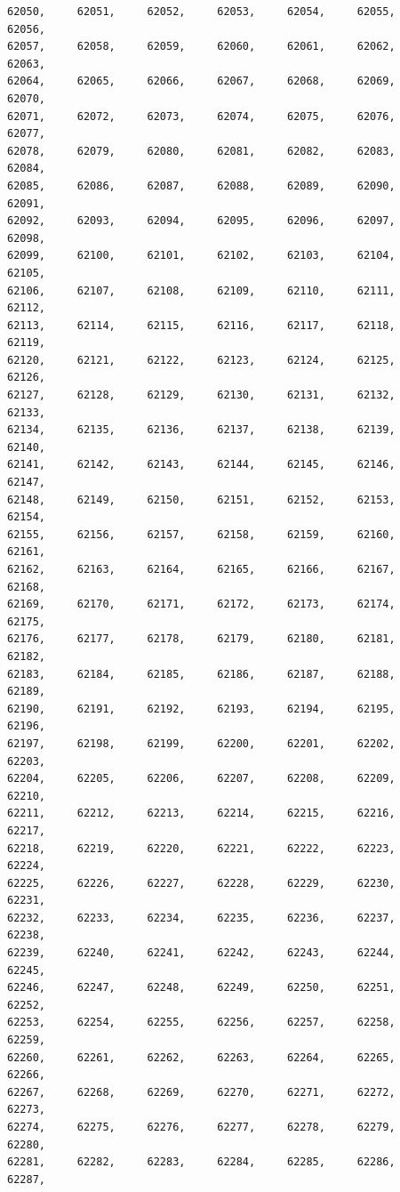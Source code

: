 \documentclass[a4paper,11pt]{report}
\begin{document}
\begin{verbatim}
62050,     62051,     62052,     62053,     62054,     62055,     62056,     
62057,     62058,     62059,     62060,     62061,     62062,     62063,     
62064,     62065,     62066,     62067,     62068,     62069,     62070,     
62071,     62072,     62073,     62074,     62075,     62076,     62077,     
62078,     62079,     62080,     62081,     62082,     62083,     62084,     
62085,     62086,     62087,     62088,     62089,     62090,     62091,     
62092,     62093,     62094,     62095,     62096,     62097,     62098,     
62099,     62100,     62101,     62102,     62103,     62104,     62105,     
62106,     62107,     62108,     62109,     62110,     62111,     62112,     
62113,     62114,     62115,     62116,     62117,     62118,     62119,     
62120,     62121,     62122,     62123,     62124,     62125,     62126,     
62127,     62128,     62129,     62130,     62131,     62132,     62133,     
62134,     62135,     62136,     62137,     62138,     62139,     62140,     
62141,     62142,     62143,     62144,     62145,     62146,     62147,     
62148,     62149,     62150,     62151,     62152,     62153,     62154,     
62155,     62156,     62157,     62158,     62159,     62160,     62161,     
62162,     62163,     62164,     62165,     62166,     62167,     62168,     
62169,     62170,     62171,     62172,     62173,     62174,     62175,     
62176,     62177,     62178,     62179,     62180,     62181,     62182,     
62183,     62184,     62185,     62186,     62187,     62188,     62189,     
62190,     62191,     62192,     62193,     62194,     62195,     62196,     
62197,     62198,     62199,     62200,     62201,     62202,     62203,     
62204,     62205,     62206,     62207,     62208,     62209,     62210,     
62211,     62212,     62213,     62214,     62215,     62216,     62217,     
62218,     62219,     62220,     62221,     62222,     62223,     62224,     
62225,     62226,     62227,     62228,     62229,     62230,     62231,     
62232,     62233,     62234,     62235,     62236,     62237,     62238,     
62239,     62240,     62241,     62242,     62243,     62244,     62245,     
62246,     62247,     62248,     62249,     62250,     62251,     62252,     
62253,     62254,     62255,     62256,     62257,     62258,     62259,     
62260,     62261,     62262,     62263,     62264,     62265,     62266,     
62267,     62268,     62269,     62270,     62271,     62272,     62273,     
62274,     62275,     62276,     62277,     62278,     62279,     62280,     
62281,     62282,     62283,     62284,     62285,     62286,     62287,     

\end{verbatim}
\end{document}
